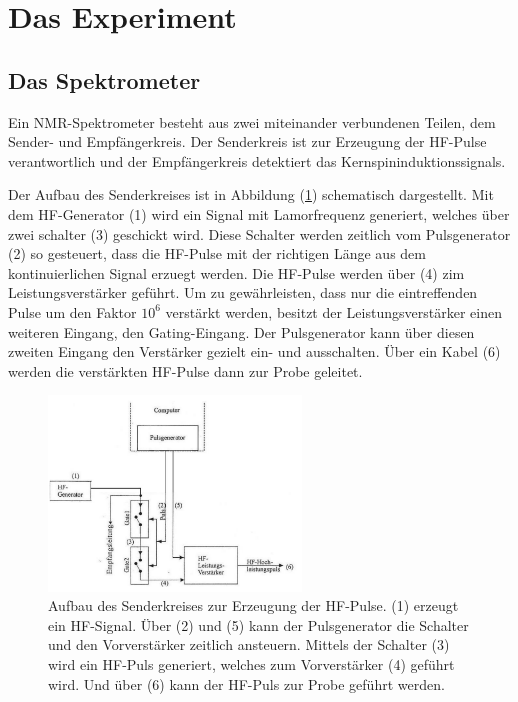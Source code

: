 \section{Das Experiment}
\subsection{Das Spektrometer}
Ein NMR-Spektrometer besteht aus zwei miteinander verbundenen Teilen, dem Sender- und Empf\"{a}ngerkreis.
Der Senderkreis ist zur Erzeugung der HF-Pulse verantwortlich und der Empf\"{a}ngerkreis detektiert das Kernspininduktionssignals.

Der Aufbau des Senderkreises ist in Abbildung (\ref{senderkreis.}) schematisch dargestellt.
Mit dem HF-Generator (1) wird ein Signal mit Lamorfrequenz generiert, welches \"{u}ber zwei schalter (3) geschickt wird.
Diese Schalter werden zeitlich vom Pulsgenerator (2) so gesteuert, dass die HF-Pulse mit der richtigen L\"{a}nge aus dem kontinuierlichen Signal erzuegt werden.
Die HF-Pulse werden \"{u}ber (4) zim Leistungsverst\"{a}rker gef\"{u}hrt.
Um zu gew\"{a}hrleisten, dass nur die eintreffenden Pulse um den Faktor $10^6$ verst\"{a}rkt werden, besitzt der Leistungsverst\"{a}rker einen weiteren Eingang, den Gating-Eingang.
Der Pulsgenerator kann \"{u}ber diesen zweiten Eingang den Verst\"{a}rker gezielt ein- und ausschalten.
\"{U}ber ein Kabel (6) werden die verst\"{a}rkten HF-Pulse dann zur Probe geleitet.
\begin{figure}
	\centering
	\includegraphics[width=0.6\textwidth]{Plots/spektrometer.png}
	\caption{Aufbau des Senderkreises zur Erzeugung der HF-Pulse. (1) erzeugt ein HF-Signal. \"{U}ber (2) und (5) kann der Pulsgenerator die Schalter und den Vorverst\"{a}rker zeitlich ansteuern. Mittels der Schalter (3) wird ein HF-Puls generiert, welches zum Vorverst\"{a}rker (4) gef\"{u}hrt wird. Und \"{u}ber (6) kann der HF-Puls  zur Probe gef\"{u}hrt werden.}
	\label{senderkreis.}
\end{figure}

